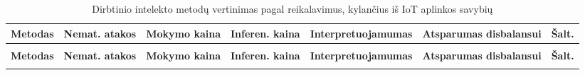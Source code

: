 \begingroup
\footnotesize
\setlength{\tabcolsep}{3pt}
\sloppy
\begin{xltabular}{\textwidth}{@{}
  >{\raggedright\arraybackslash}p{3.0cm}
  >{\centering\arraybackslash}p{1.0cm}
  >{\centering\arraybackslash}p{0.95cm}
  >{\centering\arraybackslash}p{1.05cm}
  >{\raggedright\arraybackslash}p{2.0cm}
  >{\raggedright\arraybackslash}X
  >{\raggedright\arraybackslash}p{1.7cm}@{}}
\caption{Dirbtinio intelekto metodų vertinimas pagal reikalavimus,
         kylančius iš IoT aplinkos savybių}
\label{tab:metodai} \\
\toprule
\textbf{Metodas} & \textbf{Nemat. atakos}
  & \textbf{Moky\-mo kaina} & \textbf{Infe\-ren. kaina}
  & \textbf{Interpre\-tuojamumas} & \textbf{Atsparumas disbalansui}
  & \textbf{Šalt.} \\
\midrule
\endfirsthead
{} \\
\toprule
\textbf{Metodas} & \textbf{Nemat. atakos}
  & \textbf{Moky\-mo kaina} & \textbf{Infe\-ren. kaina}
  & \textbf{Interpre\-tuojamumas} & \textbf{Atsparumas disbalansui}
  & \textbf{Šalt.} \\
\midrule
\endhead
\bottomrule
\endlastfoot


\end{xltabular}
